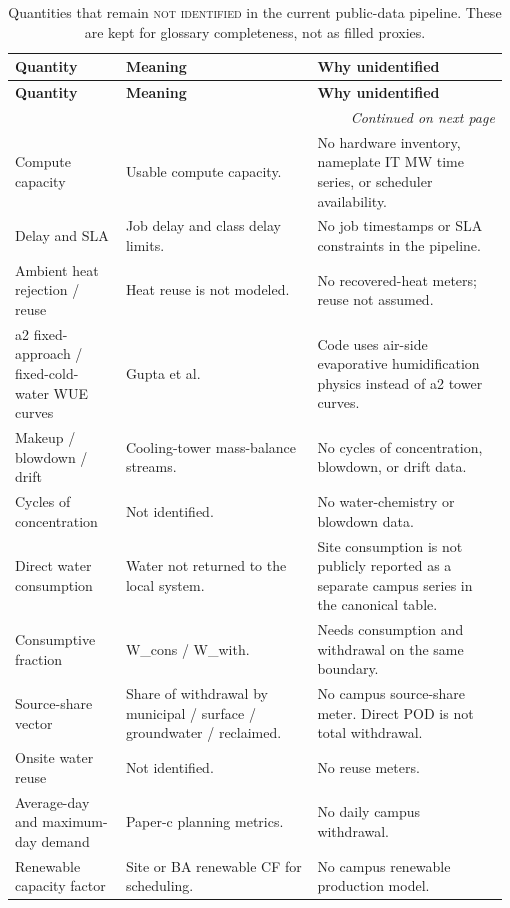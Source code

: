 \documentclass[11pt]{article}
\newcommand{\NotIdentified}{\textsc{not identified}}
\begin{document}
\begingroup
\footnotesize
\setlength{\tabcolsep}{3.5pt}
\begin{longtable}{@{}p{0.22\linewidth}p{0.38\linewidth}p{0.38\linewidth}@{}}
\caption{Quantities that remain \NotIdentified{} in the current public-data pipeline. These are kept for glossary completeness, not as filled proxies.}\\
\toprule
\textbf{Quantity} & \textbf{Meaning} & \textbf{Why unidentified} \\
\midrule
\endfirsthead
\toprule
\textbf{Quantity} & \textbf{Meaning} & \textbf{Why unidentified} \\
\midrule
\endhead
\midrule
\multicolumn{3}{r}{\emph{Continued on next page}}\\
\endfoot
\bottomrule
\endlastfoot
Compute capacity & Usable compute capacity. & No hardware inventory, nameplate IT MW time series, or scheduler availability.\\
Delay and SLA & Job delay and class delay limits. & No job timestamps or SLA constraints in the pipeline.\\
Ambient heat rejection / reuse & Heat reuse is not modeled. & No recovered-heat meters; reuse not assumed.\\
a2 fixed-approach / fixed-cold-water WUE curves & Gupta et al. & Code uses air-side evaporative humidification physics instead of a2 tower curves.\\
Makeup / blowdown / drift & Cooling-tower mass-balance streams. & No cycles of concentration, blowdown, or drift data.\\
Cycles of concentration & Not identified. & No water-chemistry or blowdown data.\\
Direct water consumption & Water not returned to the local system. & Site consumption is not publicly reported as a separate campus series in the canonical table.\\
Consumptive fraction & W\_cons / W\_with. & Needs consumption and withdrawal on the same boundary.\\
Source-share vector & Share of withdrawal by municipal / surface / groundwater / reclaimed. & No campus source-share meter. Direct POD is not total withdrawal.\\
Onsite water reuse & Not identified. & No reuse meters.\\
Average-day and maximum-day demand & Paper-c planning metrics. & No daily campus withdrawal.\\
Renewable capacity factor & Site or BA renewable CF for scheduling. & No campus renewable production model.\\

\end{longtable}
\end{document}
